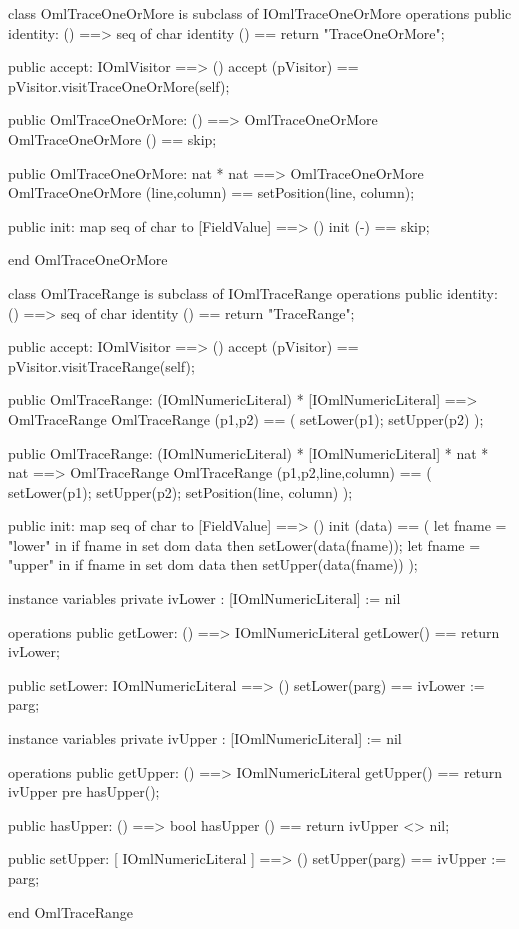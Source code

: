 \begin{vdm_al}
class OmlTraceOneOrMore is subclass of IOmlTraceOneOrMore
operations
  public identity: () ==> seq of char
  identity () == return "TraceOneOrMore";

  public accept: IOmlVisitor ==> ()
  accept (pVisitor) == pVisitor.visitTraceOneOrMore(self);

  public OmlTraceOneOrMore:
    () ==> OmlTraceOneOrMore
  OmlTraceOneOrMore () == 
    skip;

  public OmlTraceOneOrMore:
    nat *
    nat ==> OmlTraceOneOrMore
  OmlTraceOneOrMore (line,column) == 
    setPosition(line, column);

  public init: map seq of char to [FieldValue] ==> ()
  init (-) == skip;

end OmlTraceOneOrMore
\end{vdm_al}

\begin{vdm_al}
class OmlTraceRange is subclass of IOmlTraceRange
operations
  public identity: () ==> seq of char
  identity () == return "TraceRange";

  public accept: IOmlVisitor ==> ()
  accept (pVisitor) == pVisitor.visitTraceRange(self);

  public OmlTraceRange:
    (IOmlNumericLiteral) *
    [IOmlNumericLiteral] ==> OmlTraceRange
  OmlTraceRange (p1,p2) == 
    ( setLower(p1);
      setUpper(p2) );

  public OmlTraceRange:
    (IOmlNumericLiteral) *
    [IOmlNumericLiteral] *
    nat *
    nat ==> OmlTraceRange
  OmlTraceRange (p1,p2,line,column) == 
    ( setLower(p1);
      setUpper(p2);
      setPosition(line, column) );

  public init: map seq of char to [FieldValue] ==> ()
  init (data) ==
    ( let fname = "lower" in
        if fname in set dom data
        then setLower(data(fname));
      let fname = "upper" in
        if fname in set dom data
        then setUpper(data(fname)) );

instance variables
  private ivLower : [IOmlNumericLiteral] := nil

operations
  public getLower: () ==> IOmlNumericLiteral
  getLower() == return ivLower;

  public setLower: IOmlNumericLiteral ==> ()
  setLower(parg) == ivLower := parg;

instance variables
  private ivUpper : [IOmlNumericLiteral] := nil

operations
  public getUpper: () ==> IOmlNumericLiteral
  getUpper() == return ivUpper
    pre hasUpper();

  public hasUpper: () ==> bool
  hasUpper () == return ivUpper <> nil;

  public setUpper: [ IOmlNumericLiteral ] ==> ()
  setUpper(parg) == ivUpper := parg;

end OmlTraceRange
\end{vdm_al}

